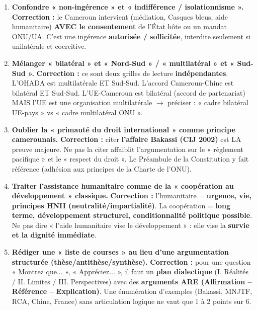 \documentclass[11pt]{article}
\begin{document}
\begin{attention}
\begin{enumerate}
    \item \textbf{Confondre « non-ingérence » et « indifférence / isolationnisme ».} \textbf{Correction :} le Cameroun intervient (médiation, Casques bleus, aide humanitaire) \textbf{AVEC le consentement} de l'État hôte ou un mandat ONU/UA. C'est une ingérence \textbf{autorisée / sollicitée}, interdite seulement si unilatérale et coercitive.
    \item \textbf{Mélanger « bilatéral » et « Nord-Sud » / « multilatéral » et « Sud-Sud ».} \textbf{Correction :} ce sont deux grilles de lecture \textbf{indépendantes}. L'OHADA est multilatérale ET Sud-Sud. L'accord Cameroun-Chine est bilatéral ET Sud-Sud. L'UE-Cameroun est bilatéral (accord de partenariat) MAIS l'UE est une organisation multilatérale $\rightarrow$ préciser : « cadre bilatéral UE-pays » vs « cadre multilatéral ONU ».
    \item \textbf{Oublier la « primauté du droit international » comme principe camerounais.} \textbf{Correction :} citer \textbf{l'affaire Bakassi (CIJ 2002)} est LA preuve majeure. Ne pas la citer affaiblit l'argumentation sur le « règlement pacifique » et le « respect du droit ». Le Préambule de la Constitution y fait référence (adhésion aux principes de la Charte de l'ONU).
    \item \textbf{Traiter l'assistance humanitaire comme de la « coopération au développement » classique.} \textbf{Correction :} l'humanitaire = \textbf{urgence, vie, principes HNII (neutralité/impartialité)}. La coopération = \textbf{long terme, développement structurel, conditionnalité politique possible}. Ne pas dire « l'aide humanitaire vise le développement » : elle vise la \textbf{survie et la dignité immédiate}.
    \item \textbf{Rédiger une « liste de courses » au lieu d'une argumentation structurée (thèse/antithèse/synthèse).} \textbf{Correction :} pour une question « Montrez que... », « Appréciez... », il faut un \textbf{plan dialectique} (I. Réalités / II. Limites / III. Perspectives) avec des \textbf{arguments ARE (Affirmation -- Référence -- Explication)}. Une énumération d'exemples (Bakassi, MNJTF, RCA, Chine, France) sans articulation logique ne vaut que 1 à 2 points sur 6.
\end{enumerate}
\end{attention}
\end{document}
